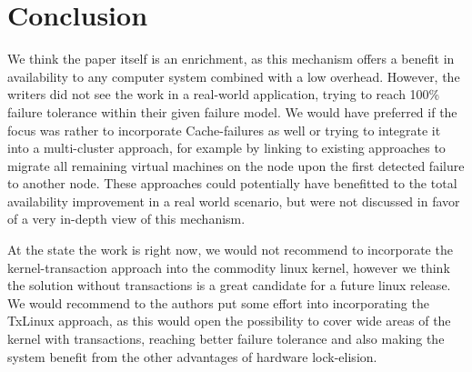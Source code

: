 \documentclass[a4paper,10pt,twoside]{article}
\begin{document}
\section{Conclusion}

We think the paper itself is an enrichment, as this mechanism offers a benefit in availability to any computer system combined with a low overhead. However, the writers did not see the work in a real-world application, trying to reach 100\% failure tolerance within their given failure model. We would have preferred if the focus was rather to incorporate Cache-failures as well or trying to integrate it into a multi-cluster approach, for example by linking to existing approaches to migrate all remaining virtual machines on the node upon the first detected failure to another node. These approaches could potentially have benefitted to the total availability improvement in a real world scenario, but were not discussed in favor of a very in-depth view of this mechanism.

At the state the work is right now, we would not recommend to incorporate the kernel-transaction approach into the commodity linux kernel, however we think the solution without transactions is a great candidate for a future linux release. We would recommend to the authors put some effort into incorporating the TxLinux approach, as this would open the possibility to cover wide areas of the kernel with transactions, reaching better failure tolerance and also making the system benefit from the other advantages of hardware lock-elision. 


 
\end{document}
